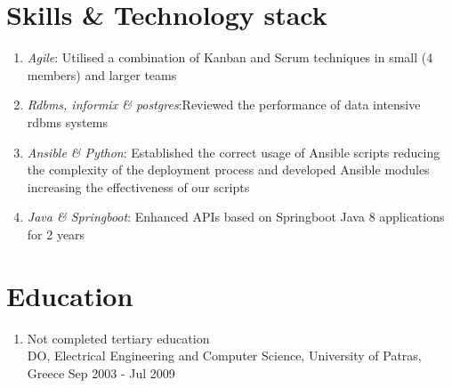 \documentclass{CVSoftwareEngineer}
\begin{document}
	\section{Skills \& Technology stack}
	\begin{enumerate}[labelwidth=!, labelindent=22pt, leftmargin=*, rightmargin=15pt]
		\item[\textasteriskcentered] \textit{Agile}: Utilised a combination of Kanban and Scrum techniques in small (4 members)
			and larger teams
		\item[\textasteriskcentered] \textit{Rdbms, informix \& postgres}:Reviewed the performance of data intensive rdbms systems
		\item[\textasteriskcentered] \textit{Ansible \& Python}: Established the correct usage of Ansible scripts reducing the complexity
			of the deployment process and developed Ansible modules increasing the effectiveness of our scripts
		\item[\textasteriskcentered] \textit{Java \& Springboot}: Enhanced APIs based on Springboot Java 8 applications for 2 years
	\end{enumerate}

	\section{Education}
	\begin{enumerate}[labelwidth=!, labelindent=0pt, leftmargin=*, rightmargin=15pt]
		\item[] Not completed tertiary education \\
			DO, Electrical Engineering and Computer Science, University of Patras, Greece \hfill {\scriptsize Sep 2003 - Jul 2009}
	\end{enumerate}
\end{document}
